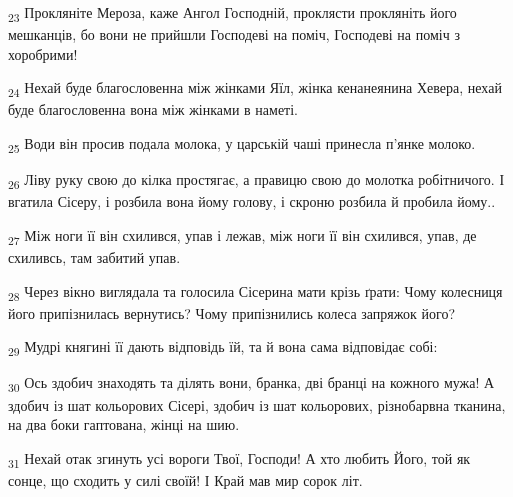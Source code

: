 \begin{tcolorbox}
\textsubscript{23} Прокляніте Мероза, каже Ангол Господній, проклясти прокляніть його мешканців, бо вони не прийшли Господеві на поміч, Господеві на поміч з хоробрими!
\end{tcolorbox}
\begin{tcolorbox}
\textsubscript{24} Нехай буде благословенна між жінками Яїл, жінка кенанеянина Хевера, нехай буде благословенна вона між жінками в наметі.
\end{tcolorbox}
\begin{tcolorbox}
\textsubscript{25} Води він просив подала молока, у царській чаші принесла п'янке молоко.
\end{tcolorbox}
\begin{tcolorbox}
\textsubscript{26} Ліву руку свою до кілка простягає, а правицю свою до молотка робітничого. І вгатила Сісеру, і розбила вона йому голову, і скроню розбила й пробила йому..
\end{tcolorbox}
\begin{tcolorbox}
\textsubscript{27} Між ноги її він схилився, упав і лежав, між ноги її він схилився, упав, де схиливсь, там забитий упав.
\end{tcolorbox}
\begin{tcolorbox}
\textsubscript{28} Через вікно виглядала та голосила Сісерина мати крізь ґрати: Чому колесниця його припізнилась вернутись? Чому припізнились колеса запряжок його?
\end{tcolorbox}
\begin{tcolorbox}
\textsubscript{29} Мудрі княгині її дають відповідь їй, та й вона сама відповідає собі:
\end{tcolorbox}
\begin{tcolorbox}
\textsubscript{30} Ось здобич знаходять та ділять вони, бранка, дві бранці на кожного мужа! А здобич із шат кольорових Сісері, здобич із шат кольорових, різнобарвна тканина, на два боки гаптована, жінці на шию.
\end{tcolorbox}
\begin{tcolorbox}
\textsubscript{31} Нехай отак згинуть усі вороги Твої, Господи! А хто любить Його, той як сонце, що сходить у силі своїй! І Край мав мир сорок літ.
\end{tcolorbox}
